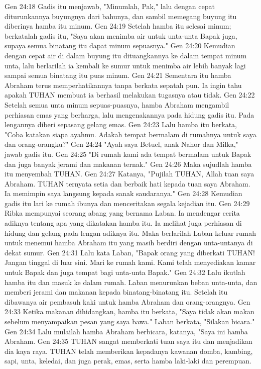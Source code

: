 Gen 24:18  Gadis itu menjawab, "Minumlah, Pak," lalu dengan cepat diturunkannya buyungnya dari bahunya, dan sambil memegang buyung itu diberinya hamba itu minum.
Gen 24:19  Setelah hamba itu selesai minum; berkatalah gadis itu, "Saya akan menimba air untuk unta-unta Bapak juga, supaya semua binatang itu dapat minum sepuasnya."
Gen 24:20  Kemudian dengan cepat air di dalam buyung itu dituangkannya ke dalam tempat minum unta, lalu berlarilah ia kembali ke sumur untuk menimba air lebih banyak lagi sampai semua binatang itu puas minum.
Gen 24:21  Sementara itu hamba Abraham terus memperhatikannya tanpa berkata sepatah pun. Ia ingin tahu apakah TUHAN membuat ia berhasil melakukan tugasnya atau tidak.
Gen 24:22  Setelah semua unta minum sepuas-puasnya, hamba Abraham mengambil perhiasan emas yang berharga, lalu mengenakannya pada hidung gadis itu. Pada lengannya diberi sepasang gelang emas.
Gen 24:23  Lalu hamba itu berkata, "Coba katakan siapa ayahmu. Adakah tempat bermalam di rumahnya untuk saya dan orang-orangku?"
Gen 24:24  "Ayah saya Betuel, anak Nahor dan Milka," jawab gadis itu.
Gen 24:25  "Di rumah kami ada tempat bermalam untuk Bapak dan juga banyak jerami dan makanan ternak."
Gen 24:26  Maka sujudlah hamba itu menyembah TUHAN.
Gen 24:27  Katanya, "Pujilah TUHAN, Allah tuan saya Abraham. TUHAN ternyata setia dan berbaik hati kepada tuan saya Abraham. Ia memimpin saya langsung kepada sanak saudaranya."
Gen 24:28  Kemudian gadis itu lari ke rumah ibunya dan menceritakan segala kejadian itu.
Gen 24:29  Ribka mempunyai seorang abang yang bernama Laban. Ia mendengar cerita adiknya tentang apa yang dikatakan hamba itu. Ia melihat juga perhiasan di hidung dan gelang pada lengan adiknya itu. Maka berlarilah Laban keluar rumah untuk menemui hamba Abraham itu yang masih berdiri dengan unta-untanya di dekat sumur.
Gen 24:31  Lalu kata Laban, "Bapak orang yang diberkati TUHAN! Jangan tinggal di luar sini. Mari ke rumah kami. Kami telah menyediakan kamar untuk Bapak dan juga tempat bagi unta-unta Bapak."
Gen 24:32  Lalu ikutlah hamba itu dan masuk ke dalam rumah. Laban menurunkan beban unta-unta, dan memberi jerami dan makanan kepada binatang-binatang itu. Setelah itu dibawanya air pembasuh kaki untuk hamba Abraham dan orang-orangnya.
Gen 24:33  Ketika makanan dihidangkan, hamba itu berkata, "Saya tidak akan makan sebelum menyampaikan pesan yang saya bawa." Laban berkata, "Silakan bicara."
Gen 24:34  Lalu mulailah hamba Abraham berbicara, katanya, "Saya ini hamba Abraham.
Gen 24:35  TUHAN sangat memberkati tuan saya itu dan menjadikan dia kaya raya. TUHAN telah memberikan kepadanya kawanan domba, kambing, sapi, unta, keledai, dan juga perak, emas, serta hamba laki-laki dan perempuan.
